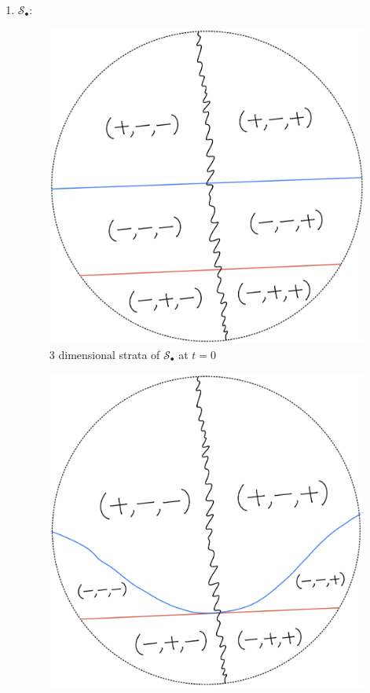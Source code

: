 \begin{definition}
\begin{enumerate}
\item $\mathcal{S}_\bullet$:
\begin{itemize}
\begin{figure}[H]
    \centering
    \includegraphics[scale = 0.95]{diagrams/lemma1/7.png} 
    \caption{3 dimensional strata of $\mathcal{S}_\bullet$ at $t=0$}
    \label{fig:your-label}
\end{figure}
\begin{figure}[H]
    \centering
    \includegraphics[scale = 0.95]{diagrams/lemma1/8.png} 

\end{figure}
\end{itemize}
\end{enumerate}
\end{definition}
